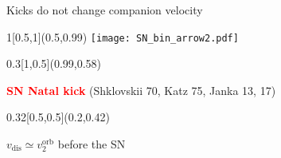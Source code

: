 \documentclass[xcolor=dvipsnames,professionalfonts, aspectratio=169]{beamer}
\begin{document}
\begin{frame}{Kicks do not change companion velocity}

    \begin{textblock}{1}[0.5,1](0.5,0.99)
      \centering
      \texttt{[image: SN\_bin\_arrow2.pdf]}
    \end{textblock}

    \begin{textblock}{0.3}[1,0.5](0.99,0.58)
      \begin{block}{\centering \textcolor{red}{\bf SN Natal kick}}
        \textcolor{gray!50}{\tiny (Shklovskii 70, Katz 75, Janka 13, 17)}
      \end{block}
    \end{textblock}

    \begin{textblock}{0.32}[0.5,0.5](0.2,0.42)
      \begin{block}{\centering \Huge \bf $v_\mathrm{dis}\simeq v_2^\mathrm{orb}$}
        \hfill before the SN\,
      \end{block}
    \end{textblock}





\end{frame}
\end{document}
